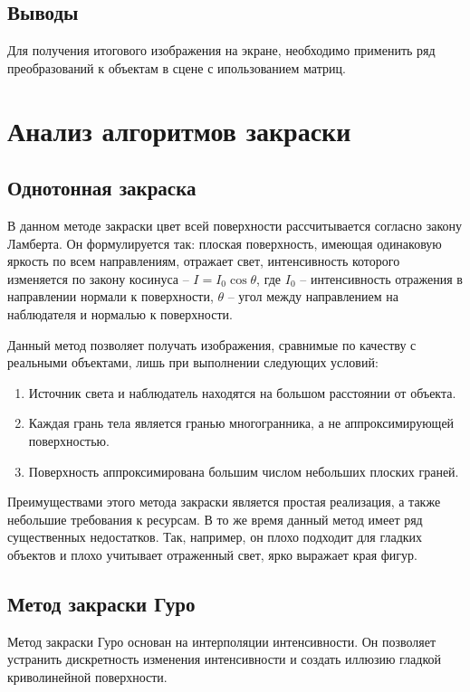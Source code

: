 \documentclass[12pt,a4paper,oneside]{report}
\begin{document}
	\subsection{Выводы}
	 \quad Для получения итогового изображения на экране, необходимо применить ряд преобразований к объектам в сцене с ипользованием матриц.

	
	
	
	\section{Анализ алгоритмов закраски}
	\subsection{Однотонная закраска}
	 \quad В данном методе закраски цвет всей поверхности рассчитывается согласно закону Ламберта. Он формулируется так: плоская поверхность, имеющая одинаковую яркость по всем направлениям, отражает свет, интенсивность которого изменяется по закону косинуса --  $I = I_0  \cos \theta$, где $I_0$ -- интенсивность отражения в направлении нормали к поверхности, $\theta$ – угол между направлением на наблюдателя и нормалью к поверхности. 
	
	 Данный метод позволяет получать изображения, сравнимые по качеству с реальными объектами, лишь при выполнении следующих условий:
	\begin{enumerate}
		\item Источник света  и наблюдатель находятся на большом расстоянии от объекта.
		\item Каждая грань тела является гранью многогранника, а не аппроксимирующей поверхностью.
		\item Поверхность аппроксимирована большим числом небольших плоских граней.
	\end{enumerate}

	 Преимуществами этого метода закраски является простая реализация, а также небольшие требования к ресурсам. В то же время данный метод имеет ряд существенных недостатков. Так, например, он плохо подходит для гладких объектов и плохо учитывает отраженный свет, ярко выражает края фигур.
	
	\subsection{Метод закраски Гуро}
	 \quad Метод закраски Гуро основан на интерполяции интенсивности. Он позволяет устранить дискретность изменения интенсивности и создать иллюзию гладкой криволинейной поверхности.
	
\end{document}
